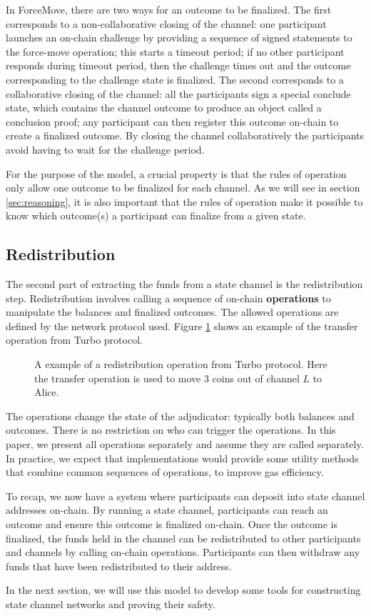 In ForceMove, there are two ways for an outcome to be finalized.
The first corresponds to a non-collaborative closing of the channel:
one participant launches an on-chain challenge by providing a sequence of signed statements to the force-move operation;
this starts a timeout period;
if no other participant responds during timeout period, then the challenge times out and the outcome
corresponding to the challenge state is finalized.
The second corresponds to a collaborative closing of the channel:
all the participants sign a special conclude state, which contains the channel outcome to
produce an object called a conclusion proof; 
any participant can then register this outcome on-chain to create a finalized outcome.
By closing the channel collaboratively the participants avoid having to wait for the challenge period.

For the purpose of the model, a crucial property is that the rules of operation only allow one outcome to be finalized for each channel.
As we will see in section \ref{sec:reasoning}, it is also important that the rules of operation make it possible to know which outcome(s) a participant can finalize from a given state.

\subsection{Redistribution}

The second part of extracting the funds from a state channel is the redistribution step.
Redistribution involves calling a sequence of on-chain \textbf{operations} to manipulate
the balances and finalized outcomes.
The allowed operations are defined by the network protocol used.
Figure \ref{fig:redistribution} shows an example of the transfer operation from Turbo protocol.

\begin{figure}[h]\centering
  \makebox[\textwidth][c]{}
  \caption{
    A example of a redistribution operation from Turbo protocol.
    Here the transfer operation is used to move $3$ coins out of channel $L$ to Alice.
  }\label{fig:redistribution}
\end{figure}

The operations change the state of the adjudicator: typically both balances and outcomes.
There is no restriction on who can trigger the operations.
In this paper, we present all operations separately and assume they are called separately.
In practice, we expect that implementations would provide some utility methods that combine
common sequences of operations, to improve gas efficiency.

To recap, we now have a system where participants can deposit into state channel addresses on-chain.
By running a state channel, participants can reach an outcome and ensure this outcome is finalized on-chain.
Once the outcome is finalized, the funds held in the channel can be redistributed to other participants and channels by calling on-chain operations.
Participants can then withdraw any funds that have been redistributed to their address.

In the next section, we will use this model to develop some tools for constructing state channel networks and proving their safety.
